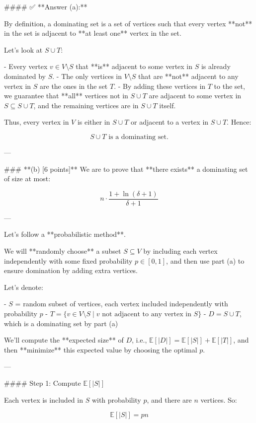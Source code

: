 \begin{enumerate}
\begin{shaded}
#### ✅ **Answer (a):**

By definition, a dominating set is a set of vertices such that every vertex **not** in the set is adjacent to **at least one** vertex in the set.

Let's look at \( S \cup T \):

- Every vertex \( v \in V \setminus S \) that **is** adjacent to some vertex in \( S \) is already dominated by \( S \).
- The only vertices in \( V \setminus S \) that are **not** adjacent to any vertex in \( S \) are the ones in the set \( T \).
- By adding these vertices in \( T \) to the set, we guarantee that **all** vertices not in \( S \cup T \) are adjacent to some vertex in \( S \subseteq S \cup T \), and the remaining vertices are in \( S \cup T \) itself.

Thus, every vertex in \( V \) is either in \( S \cup T \) or adjacent to a vertex in \( S \cup T \). Hence:

\[
\boxed{S \cup T \text{ is a dominating set.}}
\]

---

### **(b) [6 points]**
We are to prove that **there exists** a dominating set of size at most:

\[
n \cdot \frac{1 + \ln(\delta + 1)}{\delta + 1}
\]

---

Let's follow a **probabilistic method**.

We will **randomly choose** a subset \( S \subseteq V \) by including each vertex independently with some fixed probability \( p \in [0,1] \), and then use part (a) to ensure domination by adding extra vertices.

Let's denote:

- \( S \) = random subset of vertices, each vertex included independently with probability \( p \)
- \( T = \{v \in V \setminus S \mid v \text{ not adjacent to any vertex in } S\} \)
- \( D = S \cup T \), which is a dominating set by part (a)

We'll compute the **expected size** of \( D \), i.e., \( \mathbb{E}[|D|] = \mathbb{E}[|S|] + \mathbb{E}[|T|] \), and then **minimize** this expected value by choosing the optimal \( p \).

---

#### Step 1: Compute \( \mathbb{E}[|S|] \)

Each vertex is included in \( S \) with probability \( p \), and there are \( n \) vertices. So:

\[
\mathbb{E}[|S|] = pn
\]


\end{shaded}
\end{enumerate}
